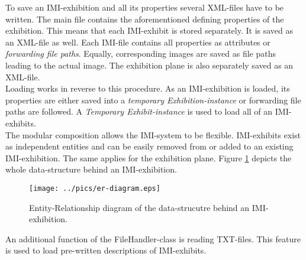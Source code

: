 To save an \ac{IMI}-exhibition and all its properties several XML-files have to be written. The main file contains the aforementioned defining properties of the exhibition. This means that each \ac{IMI}-exhibit is stored separately. It is saved as an XML-file as well. Each \ac{IMI}-file contains all properties as attributes or \textit{forwarding file paths}. Equally, corresponding images are saved as file paths leading to the actual image. The exhibition plane is also separately saved as an XML-file. 
\\
Loading works in reverse to this procedure. As an \ac{IMI}-exhibition is loaded, its properties are either saved into a \textit{temporary Exhibition-instance} or forwarding file paths are followed. A \textit{Temporary Exhibit-instance} is used to load all of an \ac{IMI}-exhibits.
\\
The modular composition allows the \ac{IMI}-system to be flexible. \ac{IMI}-exhibits exist as independent entities and can be easily removed from or added to an existing \ac{IMI}-exhibition. The same applies for the exhibition plane. Figure \ref{fig:filehandler_data_structure} depicts the whole data-structure behind an \ac{IMI}-exhibition.
\begin{figure}[H]%
\texttt{[image: ../pics/er-diagram.eps]}%
\caption{Entity-Relationship diagram of the data-strucutre behind an \ac{IMI}-exhibition.}%
\label{fig:filehandler_data_structure} %
\end{figure}

An additional function of the FileHandler-class is reading TXT-files. This feature is used to load pre-written descriptions of \ac{IMI}-exhibits.


